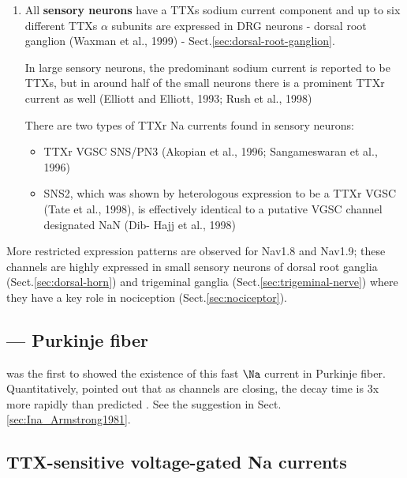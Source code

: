 \begin{enumerate}
  \item   All {\bf sensory neurons} have a TTXs sodium current component and up
  to six different TTXs $\alpha$ subunits are expressed in DRG neurons - dorsal  root
  ganglion (Waxman et  al., 1999) - Sect.\ref{sec:dorsal-root-ganglion}.

  In  large  sensory  neurons,  the  predominant  sodium current is reported to
  be TTXs, but in around half of the small neurons there is a prominent TTXr
  current as well (Elliott and Elliott, 1993; Rush et al., 1998)

There are two types of TTXr Na currents found in sensory neurons:
\begin{itemize}
  
  \item TTXr VGSC SNS/PN3 (Akopian et al., 1996; Sangameswaran et al., 1996)

  \item SNS2, which was shown by heterologous expression to
be a TTXr VGSC (Tate et al., 1998), is effectively identical to a putative VGSC
channel designated NaN (Dib- Hajj et al., 1998)
\end{itemize}

\end{enumerate}


More restricted expression patterns are observed for Nav1.8 and Nav1.9; these
channels are highly expressed in small sensory neurons of dorsal root ganglia
(Sect.\ref{sec:dorsal-horn}) and trigeminal ganglia
(Sect.\ref{sec:trigeminal-nerve}) where they have a key role in nociception
(Sect.\ref{sec:nociceptor}).

\subsection{--- Purkinje fiber}

\citep{weidmann1955cmp} was the first to showed the existence of this fast $\Na$
current in Purkinje fiber. Quantitatively,  \citep{armstrong1979} pointed out
that as channels are closing, the decay time is 3x more  rapidly than predicted
\citep{armstrong1977}. See the suggestion in Sect.\ref{sec:Ina_Armstrong1981}.



\subsection{TTX-sensitive voltage-gated Na currents}
\label{sec:Na-current-TTX-sensitive}


